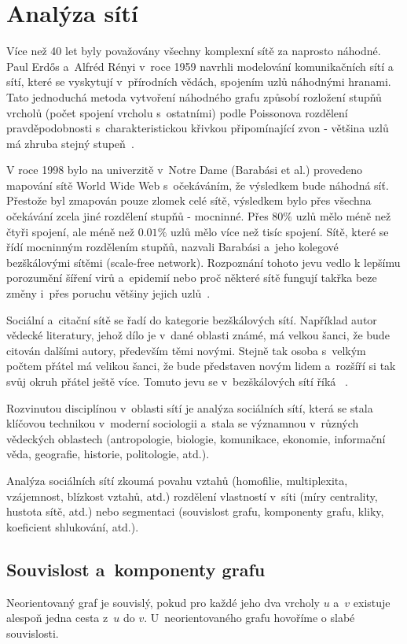 \documentclass{bakalarka}
\begin{document}
\chapter{Analýza sítí}
Více než 40 let byly považovány všechny komplexní sítě za naprosto náhodné.
Paul Erdős a~Alfréd Rényi v~roce 1959 navrhli modelování komunikačních sítí a
sítí, které se vyskytují v~přírodních vědách, spojením uzlů náhodnými hranami.
Tato jednoduchá metoda vytvoření náhodného grafu způsobí rozložení stupňů
vrcholů (počet spojení vrcholu s~ostatními) podle Poissonova rozdělení
pravděpodobnosti s~charakteristickou křivkou připomínající zvon - většina uzlů
má zhruba stejný stupeň~\citep{barabasi2005,barabasibonabeau2003}.

V roce 1998 bylo na univerzitě v~Notre Dame (Barabási et al.) provedeno
mapování sítě World Wide Web s~očekáváním, že výsledkem bude náhodná síť.
Přestože byl zmapován pouze zlomek celé sítě, výsledkem bylo přes všechna
očekávání zcela jiné rozdělení stupňů - mocninné. Přes $80\%$ uzlů mělo méně
než čtyři spojení, ale méně než $0.01\%$ uzlů mělo více než tisíc spojení.
Sítě, které se řídí mocninným rozdělením stupňů, nazvali Barabási a~jeho
kolegové bezškálovými sítěmi (scale-free network). Rozpoznání tohoto jevu vedlo
k lepšímu porozumění šíření virů a~epidemií nebo proč některé sítě fungují
takřka beze změny i~přes poruchu většiny jejich
uzlů~\citep{barabasibonabeau2003}.  

Sociální a~citační sítě se řadí do kategorie bezškálových sítí. Například autor
vědecké literatury, jehož dílo je v~dané oblasti známé, má velkou šanci, že
bude citován dalšími autory, především těmi novými. Stejně tak osoba s~velkým
počtem přátel má velikou šanci, že bude představen novým lidem a~rozšíří si tak
svůj okruh přátel ještě více. Tomuto jevu se v~bezškálových sítí říká
~\citep{barabasibonabeau2003}.

Rozvinutou disciplínou v~oblasti sítí je analýza sociálních sítí, která se
stala klíčovou technikou v~moderní sociologii a~stala se významnou v~různých
vědeckých oblastech (antropologie, biologie, komunikace, ekonomie, informační
věda, geografie, historie, politologie, atd.).

Analýza sociálních sítí zkoumá povahu vztahů (homofilie, multiplexita,
vzájemnost, blízkost vztahů, atd.) rozdělení vlastností v~síti (míry
centrality, hustota sítě, atd.) nebo segmentaci (souvislost grafu, komponenty
grafu, kliky, koeficient shlukování, atd.).

\section{Souvislost a~komponenty grafu}
Neorientovaný graf je souvislý, pokud pro každé jeho dva vrcholy $u$ a~$v$
existuje alespoň jedna cesta z~$u$ do $v$. U~neorientovaného grafu hovoříme o
slabé souvislosti. 
\end{document}
